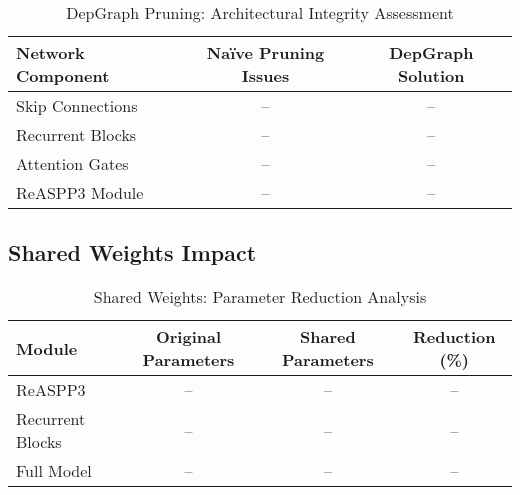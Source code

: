 \documentclass[12pt,a4paper]{article}
\begin{document}
\begin{table}[htbp]
\centering
\caption{DepGraph Pruning: Architectural Integrity Assessment}
\label{tab:depgraph_integrity}
\begin{tabular}{lcc}
\toprule
\textbf{Network Component} & \textbf{Naïve Pruning Issues} & \textbf{DepGraph Solution} \\
\midrule
Skip Connections & -- & -- \\
Recurrent Blocks & -- & -- \\
Attention Gates & -- & -- \\
ReASPP3 Module & -- & -- \\
\bottomrule
\end{tabular}
\end{table}

\subsection{Shared Weights Impact}

\begin{table}[htbp]
\centering
\caption{Shared Weights: Parameter Reduction Analysis}
\label{tab:shared_weights_reduction}
\begin{tabular}{lccc}
\toprule
\textbf{Module} & \textbf{Original Parameters} & \textbf{Shared Parameters} & \textbf{Reduction (\%)} \\
\midrule
ReASPP3 & -- & -- & -- \\
Recurrent Blocks & -- & -- & -- \\
Full Model & -- & -- & -- \\
\bottomrule
\end{tabular}
\end{table}

\begin{table}[htbp]
\centering
\caption{Shared Weights: Performance Comparison}
\label{tab:shared_weights_performance}
\end{table}
\end{document}
